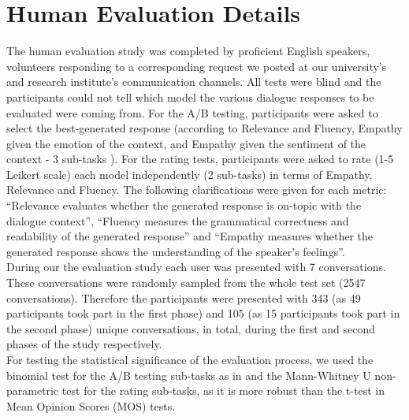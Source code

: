 \documentclass[11pt]{article}
\begin{document}
\section{Human Evaluation Details}\label{sec:eval_details}
 The human evaluation study was completed by proficient English speakers, volunteers responding to a corresponding request we posted at our university’s and research institute’s communication channels. All tests were blind and the participants could not tell which model the various dialogue responses to be evaluated were coming from. For the A/B testing, participants were asked to select the best-generated response (according to Relevance and Fluency, Empathy given the emotion of the context, and Empathy given the sentiment of the context - 3 sub-tasks ). For the rating tests, participants were asked to rate (1-5 Leikert scale) each model independently (2 sub-tasks) in terms of Empathy, Relevance and Fluency. The following clarifications were given for each metric: \enquote{Relevance evaluates whether the generated response is on-topic with the dialogue context}, \enquote{Fluency measures the grammatical correctness and readability of the generated response} and \enquote{Empathy measures whether the generated response shows the understanding of the speaker’s feelings}. 
\\
During our the evaluation study each user was presented with 7 conversations. These conversations were randomly sampled from the whole test set (2547 conversations). Therefore the participants were presented with 343 (as 49 participants took part in the first phase) and 105 (as 15 participants took part in the second phase) unique conversations, in total, during the first and second phases of the study respectively.
\\
For testing the statistical significance of the evaluation process, we used the binomial test for the A/B testing sub-tasks as in \citealp{shuster_2019_dodeca_dialogues} and the Mann-Whitney U non-parametric test \citep{Nachar_2008_U_test} for the rating sub-tasks, as it is more robust \citep{Rosenberg2017_MOS} than the t-test in Mean Opinion Scores (MOS) tests.
\end{document}
